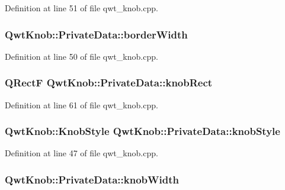 Definition at line 51 of file qwt\-\_\-knob.\-cpp.

\hypertarget{class_qwt_knob_1_1_private_data_ac84e402d536349b01e115f8d6a4bf756}{
\subsubsection[{border\-Width}]{ Qwt\-Knob\-::\-Private\-Data\-::border\-Width}}\label{class_qwt_knob_1_1_private_data_ac84e402d536349b01e115f8d6a4bf756}


Definition at line 50 of file qwt\-\_\-knob.\-cpp.

\hypertarget{class_qwt_knob_1_1_private_data_a313028569ba13a80cbe693731ee80842}{
\subsubsection[{knob\-Rect}]{\setlength{\rightskip}{0pt plus 5cm}Q\-Rect\-F Qwt\-Knob\-::\-Private\-Data\-::knob\-Rect\hspace{0.3cm}{\ttfamily [mutable]}}}\label{class_qwt_knob_1_1_private_data_a313028569ba13a80cbe693731ee80842}


Definition at line 61 of file qwt\-\_\-knob.\-cpp.

\hypertarget{class_qwt_knob_1_1_private_data_a07f2f845679c4cd3befad01dbed23380}{
\subsubsection[{knob\-Style}]{\setlength{\rightskip}{0pt plus 5cm}Qwt\-Knob\-::\-Knob\-Style Qwt\-Knob\-::\-Private\-Data\-::knob\-Style}}\label{class_qwt_knob_1_1_private_data_a07f2f845679c4cd3befad01dbed23380}


Definition at line 47 of file qwt\-\_\-knob.\-cpp.

\hypertarget{class_qwt_knob_1_1_private_data_a7e3523b564c9bbd7f04c21a11afe9b02}{
\subsubsection[{knob\-Width}]{ Qwt\-Knob\-::\-Private\-Data\-::knob\-Width}}\label{class_qwt_knob_1_1_private_data_a7e3523b564c9bbd7f04c21a11afe9b02}


